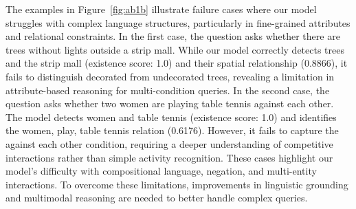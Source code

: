 The examples in Figure~\ref{fig:ab1b} illustrate failure cases where our model struggles with complex language structures, particularly in fine-grained attributes and relational constraints. In the first case, the question asks whether there are trees without lights outside a strip mall. While our model correctly detects trees and the strip mall (existence score: 1.0) and their spatial relationship (0.8866), it fails to distinguish decorated from undecorated trees, revealing a limitation in attribute-based reasoning for multi-condition queries.
In the second case, the question asks whether two women are playing table tennis against each other. The model detects women and table tennis (existence score: 1.0) and identifies the women, play, table tennis relation (0.6176). However, it fails to capture the against each other condition, requiring a deeper understanding of competitive interactions rather than simple activity recognition.
These cases highlight our model’s difficulty with compositional language, negation, and multi-entity interactions. To overcome these limitations, improvements in linguistic grounding and multimodal reasoning are needed to better handle complex queries.